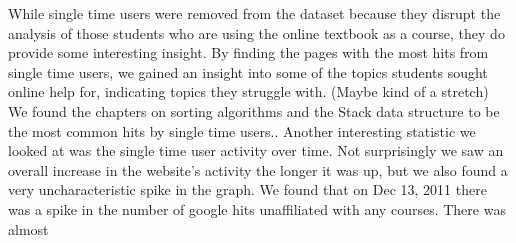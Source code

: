 While single time users were removed from the dataset because they disrupt the analysis of those students who are using the online textbook as a course, they do provide some interesting insight. By finding the pages with the most hits from single time users, we gained an insight into some of the topics students sought online help for, indicating topics they struggle with. (Maybe kind of a stretch) We found the chapters on sorting algorithms and the Stack data structure to be the most common hits by single time users..  Another interesting statistic we looked at was the single time user activity over time. Not surprisingly we saw an overall increase in the website’s activity the longer it was up, but we also found a very uncharacteristic spike in the graph. We found that on Dec 13, 2011 there was a spike in the number of google hits unaffiliated with any courses.  There was almost %


